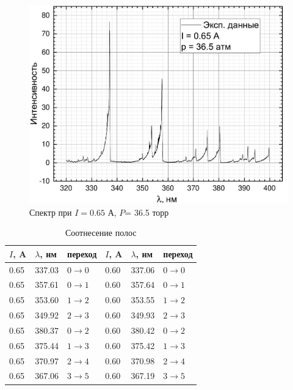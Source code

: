 \begin{figure}[H]
\begin{minipage}{0.45\linewidth}
		\centering
		\includegraphics[width=\linewidth]{data/graph_I=0,65}
		\caption{Спектр при $I= 0.65 $ А, $P$= 36.5 торр}	
		\label{full_65}
	\end{minipage} 
	\hfill
\end{figure}

\begin{table}[H]
	\centering
	\caption{Соотнесение полос}
	\begin{tabular}{ | l | l | l | l | l | l | }
	\hline
	$I$, A & $\lambda$, нм & переход & $I$, A & $\lambda$, нм & переход \\
	\hline
	\hline
	0.65 & 337.03 & $0 \rightarrow 0$ & 0.60 & 337.06 & $0 \rightarrow 0$ \\ \hline
	0.65 & 357.61 & $0 \rightarrow 1$ & 0.60 & 357.64 & $0 \rightarrow 1$ \\ \hline
	0.65 & 353.60 & $1 \rightarrow 2$ & 0.60 & 353.55 &$ 1 \rightarrow 2$ \\ \hline
	0.65 & 349.92 & $2 \rightarrow 3$ & 0.60 & 349.93 & $2 \rightarrow 3$ \\ \hline
	0.65 & 380.37 & $0 \rightarrow 2$ & 0.60 & 380.42 & $0 \rightarrow 2$ \\ \hline
	0.65 & 375.44 & $1 \rightarrow 3$ & 0.60 & 375.42 & $1 \rightarrow 3$ \\ \hline
	0.65 & 370.97 & $2 \rightarrow 4$ & 0.60 & 370.98 & $2 \rightarrow 4$ \\ \hline
	0.65 & 367.06 & $3 \rightarrow 5$ & 0.60 & 367.19 & $3 \rightarrow 5$ \\ \hline
	\end{tabular}
	\label{tab:polosi}%
\end{table}%

